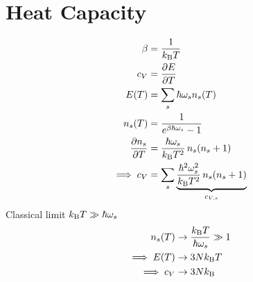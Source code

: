 \newpage

\section{Heat Capacity}
\begin{subequations}
\begin{align}
	\beta
		& = \frac{1}{k_{\rm B} T} \\
	c_V 
		&= \frac{\partial E}{\partial T} \\
	E (T)
		&= \sum_s \hbar \omega_s n_s (T) \\
	n_s (T)
		&= \frac{1}{e^{\beta \hbar \omega_s} - 1} \\
	\frac{\partial n_s}{\partial T}
		&= \frac{\hbar \omega_s}{k_{\rm B} T^2} \, n_s (n_s + 1) \\
	\implies c_V
		&= \sum_s \underset{c_{V, s}}{\underbrace{\frac{\hbar^2 \omega_s^2}{k_{\rm B} T^2} \, n_s (n_s + 1)}}
\end{align}
\end{subequations}
Classical limit $k_{\rm B} T \gg \hbar \omega_s$
\begin{subequations}
\begin{align}
	n_s (T) 
		&\to \frac{k_{\rm B} T}{\hbar \omega_s} \gg 1 \\
	\implies E(T)
		&\to 3 N k_{\rm B} T \\
	\implies c_V 
		&\to 3 N k_{\rm B}
\end{align}
\end{subequations}